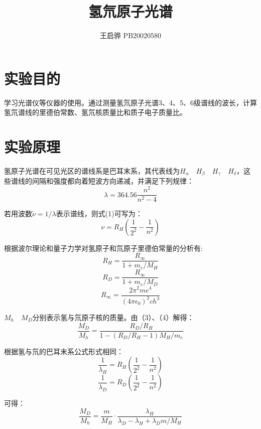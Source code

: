 \documentclass{report}
\title{\songti \zihao{2}\bfseries 氢氘原子光谱}
\author{王启骅 PB20020580}
\begin{document}
	\maketitle
	\section{实验目的}
学习光谱仪等仪器的使用。通过测量氢氘原子光谱3、4、5、6级谱线的波长，计算氢氘谱线的里德伯常数、氢氘核质量比和质子电子质量比。
	\section{实验原理}

氢原子光谱在可见光区的谱线系是巴耳末系，其代表线为$ H_{\alpha}\quad H_{\beta}\quad H_{\gamma}\quad H_{\delta} $，这些谱线的间隔和强度都向着短波方向递减，并满足下列规律：
	\begin{equation}
		\lambda=364.56\dfrac{n^2}{n^2-4}
	\end{equation}


 若用波数$ \tilde{\nu}=1/\lambda $表示谱线，则式(1)可写为：
 	\begin{equation}
 	\nu=R_H(\frac{1}{2^2}-\frac{1}{n^2})
 \end{equation}


根据波尔理论和量子力学对氢原子和氘原子里德伯常量的分析有:
 	\begin{equation}
	R_H=\dfrac{R_{\infty}}{1+m_e/M_H}
\end{equation}
 	\begin{equation}
	R_D=\dfrac{R_{\infty}}{1+m_e/M_D}
\end{equation}
 	\begin{equation}
	R_{\infty}=\dfrac{2\pi^2me^4}{(4\pi \epsilon_0)^2ch^3}
\end{equation}


$ M_h \quad M_D $分别表示氢与氘原子核的质量。由（3）、（4）解得：
 	\begin{equation}
\frac{M_D}{M_h}=\dfrac{R_D/R_H}{1-(R_D/R_H-1)M_H/m_e}
\end{equation}


根据氢与氘的巴耳末系公式形式相同：
 	\begin{equation}
	\frac{1}{\lambda_H}=R_H(\frac{1}{2^2}-\frac{1}{n^2})
\end{equation}
 	\begin{equation}
	\frac{1}{\lambda_D}=R_D(\frac{1}{2^2}-\frac{1}{n^2})
\end{equation}


可得：
 	\begin{equation}
	\frac{M_D}{M_h}=\frac{m}{M_H}\cdot\dfrac{\lambda_H}{\lambda_D-\lambda_H+\lambda_D m/M_H}
\end{equation}
\end{document}
